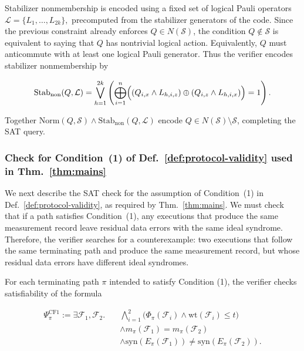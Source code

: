 \documentclass[acmsmall,screen,review,anonymous,nonacm]{acmart}
\newcommand{\cS}{\mathcal{S}}
\begin{document}
Stabilizer nonmembership is encoded using a fixed set of logical Pauli operators
$
\mathcal{L} = \{L_1,\ldots,L_{2k}\},
$
precomputed from the stabilizer generators of the code.
Since the previous constraint already enforces $Q\in N(\mathcal S)$, the
condition $Q\notin\mathcal S$ is equivalent to saying that $Q$ has nontrivial
logical action. Equivalently, $Q$ must anticommute with at least one logical
Pauli generator. Thus the verifier encodes stabilizer nonmembership by

\begin{equation} \label{eq:stabiizer-nonmembership}
    \begin{aligned}
       \mathrm{Stab}_{\mathrm{non}}(Q, \mathcal{L}) = \bigvee_{h=1}^{2k}
\left(
\bigoplus_{i=1}^n
\Bigl(
(Q_{i,x} \land L_{h,i,z})
\oplus
(Q_{i,z} \land L_{h,i,x})
\Bigr)
=1
\right).
    \end{aligned}
\end{equation}



Together $\mathrm{Norm}(Q,\mathcal{S}) \wedge \mathrm{Stab}_{\mathrm{non}}(Q, \mathcal{L})$ encode $Q\in N(\cS)\setminus\cS$,
completing the SAT query.



\subsubsection{Check for Condition~(1) of Def.~\ref{def:protocol-validity} used in Thm.~\ref{thm:mains}}
\label{subsec:cf-validity-condition1}

We next describe the SAT check for the assumption of Condition~(1) in Def.~\ref{def:protocol-validity}, as required by Thm.~\ref{thm:mains}. We must check that if a path satisfies Condition~(1), any executions that produce the same measurement record leave residual data errors with the same ideal syndrome. Therefore, the verifier searches for a counterexample: two executions that follow the same terminating path and produce the same measurement record, but whose residual data errors have different ideal syndromes.

For each terminating path $\pi$ intended to satisfy Condition (1), the verifier
checks satisfiability of the formula

\begin{equation}
\begin{aligned}
\Psi^{\mathrm{CF1}}_\pi
:=\exists \mathcal F_1,\mathcal F_2.\quad
&\bigwedge_{i=1}^{2}\bigl(
  \Phi_\pi(\mathcal F_i)\land\mathrm{wt}(\mathcal F_i)\le t\bigr)\\
&\land m_\pi(\mathcal F_1)=m_\pi(\mathcal F_2)\\
&\land \mathrm{syn}(E_\pi(\mathcal F_1))
 \ne \mathrm{syn}(E_\pi(\mathcal F_2)).
\end{aligned}
\end{equation}
\end{document}
